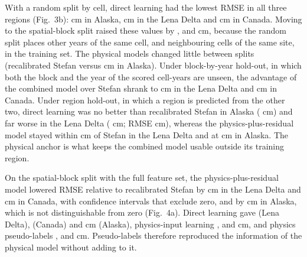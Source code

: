 With a random split by cell, direct learning had the lowest RMSE in all three regions (Fig.~3b): \nrmseAkrandDz{} cm in Alaska, \nrmseLerandDz{} cm in the Lena Delta and \nrmseCarandDz{} cm in Canada. Moving to the spatial-block split raised these values by \noptimAkDz{}, \noptimLeDz{} and \noptimCaDz{} cm, because the random split places other years of the same cell, and neighbouring cells of the same site, in the training set. The physical models changed little between splits (recalibrated Stefan \nrmseAkrandPo{} versus \nrmseAkblkPo{} cm in Alaska). Under block-by-year hold-out, in which both the block and the year of the scored cell-years are unseen, the advantage of the combined model over Stefan shrank to \ndrefLeblkyrRo{} cm in the Lena Delta and \ndrefCablkyrRo{} cm in Canada. Under region hold-out, in which a region is predicted from the other two, direct learning was no better than recalibrated Stefan in Alaska (\ndrefAkregDz{} cm) and far worse in the Lena Delta (\ndrefLeregDz{} cm; RMSE \nrmseLeregDz{} cm), whereas the physics-plus-residual model stayed within \ndrefLeregRo{} cm of Stefan in the Lena Delta and at \nrmseAkregRo{} cm in Alaska. The physical anchor is what keeps the combined model usable outside its training region.

On the spatial-block split with the full feature set, the physics-plus-residual model lowered RMSE relative to recalibrated Stefan by \ndrefLeblkRo{} cm in the Lena Delta and \ndrefCablkRo{} cm in Canada, with confidence intervals that exclude zero, and by \ndrefAkblkRo{} cm in Alaska, which is not distinguishable from zero (Fig.~4a). Direct learning gave \ndrefLeblkDz{} (Lena Delta), \ndrefCablkDz{} (Canada) and \ndrefAkblkDz{} cm (Alaska), physics-input learning \ndrefLeblkFo{}, \ndrefCablkFo{} and \ndrefAkblkFo{} cm, and physics pseudo-labels \ndrefLeblkDo{}, \ndrefCablkDo{} and \ndrefAkblkDo{} cm. Pseudo-labels therefore reproduced the information of the physical model without adding to it.

